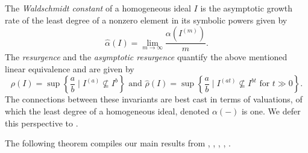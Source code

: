 \documentclass[11pt, reqno]{amsart}
\numberwithin{equation}{section}
\theoremstyle{definition}
\begin{document}
The {\em Waldschmidt constant} of  a homogeneous ideal $I$ is the asymptotic growth rate of the least degree of a nonzero element in its symbolic powers given by
\[
\widehat{\alpha}(I)=\lim_{m\to\infty} \frac{\alpha(I^{(m)})}{m}.
\]
The {\em resurgence} and the {\em asymptotic resurgence} quantify the above mentioned linear equivalence and are given by
 \[
 \rho(I)=\sup\left \{\frac{a}{b} \mid I^{(a)}\not\subseteq I^b \right \} \text{ and } \widehat{\rho}(I)=\sup\left \{\frac{a}{b} \mid I^{(at)}\not\subseteq I^{bt} \text{ for }t\gg0 \right \}.
 \]
The connections between these invariants are best cast in terms of valuations, of which the least degree of a homogeneous ideal, denoted $\alpha(-)$ is one. We defer this perspective to .

The following theorem compiles our main results  from ,
, , , .
\end{document}
